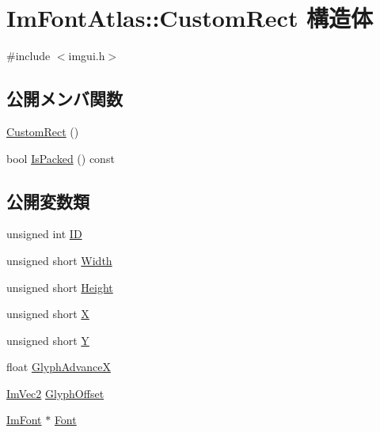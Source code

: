 \hypertarget{struct_im_font_atlas_1_1_custom_rect}{}\section{Im\+Font\+Atlas\+:\+:Custom\+Rect 構造体}
\label{struct_im_font_atlas_1_1_custom_rect}


{\ttfamily \#include $<$imgui.\+h$>$}

\subsection*{公開メンバ関数}
\begin{DoxyCompactItemize}
\item 
\mbox{\hyperlink{struct_im_font_atlas_1_1_custom_rect_abee2845214da5ffc9c77bb388402a0a9}{Custom\+Rect}} ()
\item 
bool \mbox{\hyperlink{struct_im_font_atlas_1_1_custom_rect_ac15602342c8eabbddf559bc84a3e6700}{Is\+Packed}} () const
\end{DoxyCompactItemize}
\subsection*{公開変数類}
\begin{DoxyCompactItemize}
\item 
unsigned int \mbox{\hyperlink{struct_im_font_atlas_1_1_custom_rect_a1afc9c6d72105e6695fbefa08e086387}{ID}}
\item 
unsigned short \mbox{\hyperlink{struct_im_font_atlas_1_1_custom_rect_a961e02b6cda1eb69dfd2f2d40ae40d5f}{Width}}
\item 
unsigned short \mbox{\hyperlink{struct_im_font_atlas_1_1_custom_rect_a7b423a44d98a6f5695941300906418e5}{Height}}
\item 
unsigned short \mbox{\hyperlink{struct_im_font_atlas_1_1_custom_rect_af080bc8663332dfd5576d9a6a5313089}{X}}
\item 
unsigned short \mbox{\hyperlink{struct_im_font_atlas_1_1_custom_rect_ae1739c480b82fa11ebdd1edb9e3cf5eb}{Y}}
\item 
float \mbox{\hyperlink{struct_im_font_atlas_1_1_custom_rect_afb55b310d9816386f2eb2f11df9f11e2}{Glyph\+AdvanceX}}
\item 
\mbox{\hyperlink{struct_im_vec2}{Im\+Vec2}} \mbox{\hyperlink{struct_im_font_atlas_1_1_custom_rect_a18a84c649c382fafe75eba628b5d599e}{Glyph\+Offset}}
\item 
\mbox{\hyperlink{struct_im_font}{Im\+Font}} $\ast$ \mbox{\hyperlink{struct_im_font_atlas_1_1_custom_rect_aeffa65b37c8d9241e3720472a019aad2}{Font}}
\end{DoxyCompactItemize}


